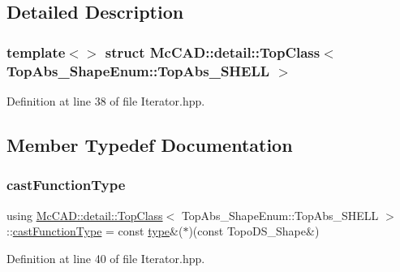 \subsection{Detailed Description}
\subsubsection*{template$<$$>$\newline
struct Mc\+C\+A\+D\+::detail\+::\+Top\+Class$<$ Top\+Abs\+\_\+\+Shape\+Enum\+::\+Top\+Abs\+\_\+\+S\+H\+E\+L\+L $>$}



Definition at line 38 of file Iterator.\+hpp.



\subsection{Member Typedef Documentation}
\mbox{\label{structMcCAD_1_1detail_1_1TopClass_3_01TopAbs__ShapeEnum_1_1TopAbs__SHELL_01_4_a320992f49b79075479043b38c34c27fb}} 
\subsubsection{\texorpdfstring{cast\+Function\+Type}{castFunctionType}}
{\footnotesize\ttfamily using \hyperlink{structMcCAD_1_1detail_1_1TopClass}{Mc\+C\+A\+D\+::detail\+::\+Top\+Class}$<$ Top\+Abs\+\_\+\+Shape\+Enum\+::\+Top\+Abs\+\_\+\+S\+H\+E\+LL $>$\+::\hyperlink{structMcCAD_1_1detail_1_1TopClass_3_01TopAbs__ShapeEnum_1_1TopAbs__SHELL_01_4_a320992f49b79075479043b38c34c27fb}{cast\+Function\+Type} =  const \hyperlink{structMcCAD_1_1detail_1_1TopClass_3_01TopAbs__ShapeEnum_1_1TopAbs__SHELL_01_4_ab3f5bb2954f60c3dbdd31ff79a77999a}{type}\&($\ast$)(const Topo\+D\+S\+\_\+\+Shape\&)}



Definition at line 40 of file Iterator.\+hpp.


